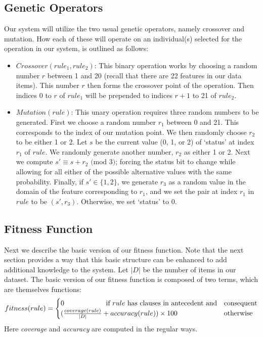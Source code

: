 \documentclass{amsart}
\theoremstyle{definition}
\theoremstyle{remark}
\numberwithin{equation}{section}
\begin{document}
\subsection{Genetic Operators}
Our system will utilize the two usual genetic operators, namely crossover and mutation. How each of these will operate on an individual(s) selected for the operation in our system, is outlined as follows:

\begin{itemize}
	\item $Crossover(rule_1,rule_2)$: This binary operation works by choosing a random number $r$ between 1 and 20 (recall that there are 22 features in our data items). This number $r$ then forms the crossover point of the operation. Then indices 0 to $r$ of $rule_1$ will be prepended to indices $r+1$ to 21 of $rule_2$.
	\item$Mutation(rule)$: This unary operation requires three random numbers to be generated. First we choose a random number $r_1$ between 0 and 21. This corresponds to the index of our mutation point. We then randomly choose $r_2$ to be either 1 or 2. Let $s$ be the current value (0, 1, or 2) of `status' at index $r_1$ of $rule$. We randomly generate another number, $r_2$ as either 1 or 2. Next we compute $s' \equiv s + r_2\text{ (mod }3)$; forcing the status bit to change while allowing for all either of the possible alternative values with the same probability. Finally, if $s' \in \{1,2\}$, we generate $r_3$ as a random value in the domain of the feature corresponding to $r_1$, and we set the pair at index $r_1$ in $rule$ to be $(s', r_3)$. Otherwise, we set `status' to 0.
\end{itemize}

\subsection{Fitness Function}

Next we describe the basic version of our fitness function. Note that the next section provides a way that this basic structure can be enhanced to add additional knowledge to the system. Let $|D|$ be the number of items in our dataset. The basic version of our fitness function is composed of two terms, which are themselves functions:\newline
\[
  fitness(rule) =
  \begin{cases}
                                   0  \text{\hspace{2cm} if $rule$ has clauses in antecedent and} & \text{consequent} \\
                                   (\frac{coverage(rule)}{|D|} + accuracy(rule))\times 100 & \text{otherwise} \\
  \end{cases}
\]
Here \textit{coverage} and \textit{accuracy} are computed in the regular ways. 
\end{document}
